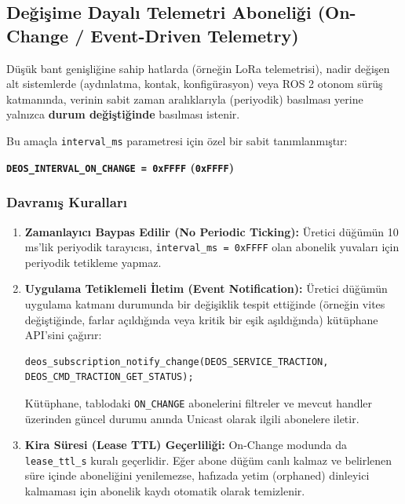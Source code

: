 \documentclass[a4paper,10pt]{article}
\newcommand{\hex}[1]{\texttt{0x#1}}
\newcommand{\code}[1]{\texttt{#1}}
\begin{document}
\subsection{Değişime Dayalı Telemetri Aboneliği (On-Change / Event-Driven Telemetry)}

Düşük bant genişliğine sahip hatlarda (örneğin LoRa telemetrisi), nadir değişen alt sistemlerde (aydınlatma, kontak, konfigürasyon) veya ROS 2 otonom sürüş katmanında, verinin sabit zaman aralıklarıyla (periyodik) basılması yerine yalnızca \textbf{durum değiştiğinde} basılması istenir.

Bu amaçla \code{interval\_ms} parametresi için özel bir sabit tanımlanmıştır:

\begin{center}
\textbf{\code{DEOS\_INTERVAL\_ON\_CHANGE = 0xFFFF} (\hex{FFFF})}
\end{center}

\subsubsection{Davranış Kuralları}
\begin{enumerate}
    \item \textbf{Zamanlayıcı Baypas Edilir (No Periodic Ticking):}
    Üretici düğümün 10 ms'lik periyodik tarayıcısı, \code{interval\_ms = 0xFFFF} olan abonelik yuvaları için periyodik tetikleme yapmaz.
    
    \item \textbf{Uygulama Tetiklemeli İletim (Event Notification):}
    Üretici düğümün uygulama katmanı durumunda bir değişiklik tespit ettiğinde (örneğin vites değiştiğinde, farlar açıldığında veya kritik bir eşik aşıldığında) kütüphane API'sini çağırır:
    \begin{lstlisting}[style=cstyle]
deos_subscription_notify_change(DEOS_SERVICE_TRACTION, DEOS_CMD_TRACTION_GET_STATUS);
    \end{lstlisting}
    Kütüphane, tablodaki \code{ON\_CHANGE} abonelerini filtreler ve mevcut handler üzerinden güncel durumu anında Unicast olarak ilgili abonelere iletir.

    \item \textbf{Kira Süresi (Lease TTL) Geçerliliği:}
    On-Change modunda da \code{lease\_ttl\_s} kuralı geçerlidir. Eğer abone düğüm canlı kalmaz ve belirlenen süre içinde aboneliğini yenilemezse, hafızada yetim (orphaned) dinleyici kalmaması için abonelik kaydı otomatik olarak temizlenir.
\end{enumerate}
\end{document}
